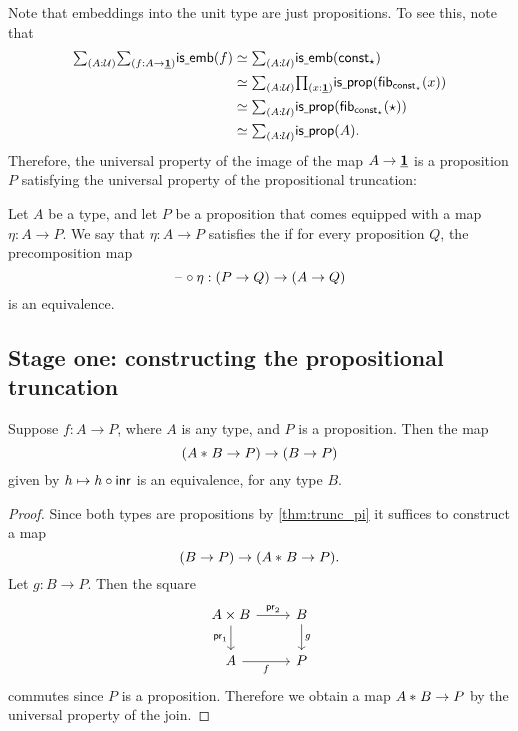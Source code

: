Note that embeddings into the unit type are just propositions. To see this, note that
\begin{align*}
\sm{A:\UU}{f:A\to\unit}\isemb(f)
& \eqvsym \sm{A:\UU}\isemb(\const_\ttt) \\
& \eqvsym \sm{A:\UU}\prd{x:\unit}\isprop(\fib{\const_\ttt}{x}) \\
& \eqvsym \sm{A:\UU}\isprop(\fib{\const_\ttt}{\ttt}) \\
& \eqvsym \sm{A:\UU}\isprop(A).
\end{align*}
Therefore, the universal property of the image of the map $A\to\underline{\mathbf{1}}$ is a proposition $P$ satisfying the universal property of the propositional truncation:

\begin{defn}
Let $A$ be a type, and let $P$ be a proposition that comes equipped with a map $\eta:A\to P$. We say that $\eta:A\to P$ satisfies the  if for every proposition $Q$, the precomposition map
\begin{equation*}
\mathord{\hspace{1pt}\text{--}\hspace{1pt}}\circ\eta:(P\to Q)\to (A\to Q)
\end{equation*}
is an equivalence.
\end{defn}

\subsection{Stage one: constructing the propositional truncation}

\begin{lem}\label{lem:extend_join_prop}
Suppose $f:A\to P$, where $A$ is any type, and $P$ is a proposition.
Then the map
\begin{equation*}
({A}\ast_{}{B}\to P)\to (B\to P)
\end{equation*}
given by $h\mapsto h\circ {\mathsf{inr}}$ is an equivalence, for any type $B$.
\end{lem}

\begin{proof}
Since both types are propositions by \cref{thm:trunc_pi} it suffices to construct a map
\begin{equation*}
(B\to P)\to ({A}\ast_{}{B}\to P).
\end{equation*}
Let $g:B\to P$. Then the square
\begin{equation*}
\begin{tikzcd}
A\times B \arrow[r,"\proj 2"] \arrow[d,swap,"\proj 1"] & B \arrow[d,"g"] \\
A \arrow[r,swap,"f"] & P
\end{tikzcd}
\end{equation*}
commutes since $P$ is a proposition. Therefore we obtain a map ${A}\ast_{}{B}\to P$ by the universal property of the join.
\end{proof}


